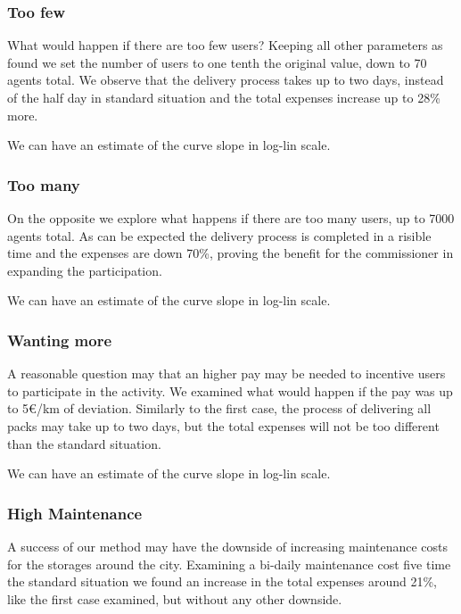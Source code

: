 \documentclass[11pt,a4paper]{article}
\begin{document}
\subsubsection*{Too few}
What would happen if there are too few users? 
Keeping all other parameters as found we set the number of users to one tenth the original value, down to 70 agents total.
We observe that the delivery process takes up to two days, instead of the half day in standard situation and the total expenses increase up to 28\% more.



We can have an estimate of the curve slope in log-lin scale.



\newpage
\subsubsection*{Too many}
On the opposite we explore what happens if there are too many users, up to 7000 agents total.
As can be expected the delivery process is completed in a risible time and the expenses are down 70\%, proving the benefit for the commissioner in expanding the participation.


We can have an estimate of the curve slope in log-lin scale.



\newpage
\subsubsection*{Wanting more}
A reasonable question may that an higher pay may be needed to incentive users to participate in the activity. 
We examined what would happen if the pay was up to 5\euro{}/km of deviation.
Similarly to the first case, the process of delivering all packs may take up to two days, but the total expenses will not be too different than the standard situation.


We can have an estimate of the curve slope in log-lin scale.



\newpage
\subsubsection*{High Maintenance}
A success of our method may have the downside of increasing maintenance costs for the storages around the city.
Examining a bi-daily maintenance cost five time the standard situation we found an increase in the total expenses around 21\%, like the first case examined, but without any other downside.
\end{document}
